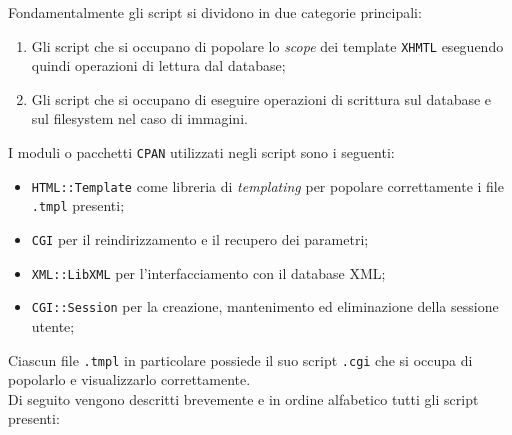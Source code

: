 Fondamentalmente gli script si dividono in due categorie principali:

\begin{enumerate}

	\item Gli script che si occupano di popolare lo \textit{scope} dei template \texttt{XHMTL} eseguendo quindi operazioni di lettura dal database;
	\item Gli script che si occupano di eseguire operazioni di scrittura sul database e sul filesystem nel caso di immagini.

\end{enumerate}

I moduli o pacchetti \texttt{CPAN} utilizzati negli script sono i seguenti:

\begin{itemize}

	\item \texttt{HTML::Template} come libreria di \textit{templating} per popolare correttamente i file \texttt{.tmpl} presenti;
	\item \texttt{CGI} per il reindirizzamento e il recupero dei parametri;
	\item \texttt{XML::LibXML} per l'interfacciamento con il database XML;
	\item \texttt{CGI::Session} per la creazione, mantenimento ed eliminazione della sessione utente; 
\end{itemize}
Ciascun file \texttt{.tmpl} in particolare possiede il suo script \texttt{.cgi} che si occupa di popolarlo e visualizzarlo correttamente. \\
Di seguito vengono descritti brevemente e in ordine alfabetico tutti gli script presenti:


